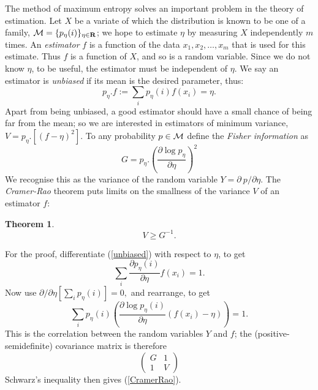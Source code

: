 \documentclass[12pt]{article}
\newtheorem{theorem}{Theorem}[section]
\begin{document}
The method of maximum entropy solves an important problem in the theory of
estimation. Let $X$ be a variate of which the distribution is known
to be one of a family, ${\cal M}=\{p_\eta(i)\}_{\eta\in{\bf R}}$;
we hope to estimate
$\eta$ by measuring $X$ independently $m$ times. An {\em estimator}
$f$ is a function of the data $x_1,x_2,\ldots,x_m$
that is used for this estimate.
Thus $f$ is a function of $X$, and so is a random variable.
Since we do not know $\eta$, to be useful,
the estimator must be independent of $\eta$. We say an estimator is {\em
unbiased} if its mean is the desired parameter, thus:
\begin{equation}
p_\eta.f:=\sum_ip_\eta(i)f(x_i)=\eta.
\label{unbiased}
\end{equation}
Apart from being unbiased, a good estimator should have a small chance
of being far from the mean; so we are interested in estimators of
minimum variance, $V=p_\eta.[(f-\eta)^2]$.
To any probability $p\in{\cal M}$ define the
{\em Fisher information} as \cite{Rao,Fisher}
\begin{equation}
G=p_\eta.\left(\frac{\partial\log p_\eta}{\partial\eta}\right)^2
\label{Fisher}
\end{equation}
We recognise this as the variance of the random variable $Y=\partial\
p/\partial\eta$.
The {\em Cramer-Rao} theorem puts limits on the smallness
of the variance $V$ of an estimator $f$: 
\begin{theorem}
\begin{equation}
V\geq G^{-1}.
\label{CramerRao}
\end{equation}
\end{theorem}
For the proof, differentiate (\ref{unbiased}) with respect to $\eta$,
to get
\[\sum_i\frac{\partial p_\eta(i)}{\partial \eta}f(x_i)=1.\]
Now use $\partial/\partial\eta[\sum_ip_\eta(i)]=0,$ and rearrange, to get
\begin{equation}
\sum_ip_\eta(i)\left(\frac{\partial\log p_\eta(i)}{\partial\eta}
(f(x_i)-\eta)\right)=1.
\label{Schwarz}
\end{equation}
This is the correlation between the random variables $Y$ and $f$;
the (positive-semidefinite) covariance matrix is therefore
\begin{equation}
\left(\begin{array}{cc}
      G&1\\
      1&V
\end{array}\right)
\end{equation}
Schwarz's inequality then gives (\ref{CramerRao}).
\end{document}
